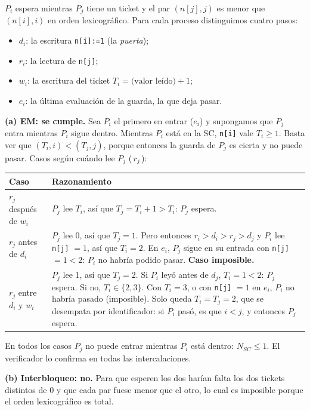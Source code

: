 \begin{solucion}
$P_i$ espera mientras $P_j$ tiene un ticket y el par $(n[j], j)$ es menor que $(n[i], i)$ en orden lexicográfico.
Para cada proceso distinguimos cuatro pasos:
\begin{itemize}[leftmargin=*,noitemsep]
  \item $d_i$: la escritura \texttt{n[i]:=1} (la \emph{puerta});
  \item $r_i$: la lectura de \texttt{n[j]};
  \item $w_i$: la escritura del ticket $T_i = \text{(valor leído)} + 1$;
  \item $e_i$: la última evaluación de la guarda, la que deja pasar.
\end{itemize}

\textbf{(a) EM: se cumple.} Sea $P_i$ el primero en entrar ($e_i$) y supongamos que $P_j$ entra mientras $P_i$
sigue dentro. Mientras $P_i$ está en la SC, \texttt{n[i]} vale $T_i \ge 1$. Basta ver que $(T_i, i) < (T_j, j)$,
porque entonces la guarda de $P_j$ es cierta y no puede pasar. Casos según cuándo lee $P_j$ (\,$r_j$\,):
\begin{center}\small
\begin{tabular}{p{3.6cm}p{10.2cm}}
\toprule
\textbf{Caso} & \textbf{Razonamiento} \\ \midrule
$r_j$ después de $w_i$ & $P_j$ lee $T_i$, así que $T_j = T_i + 1 > T_i$: $P_j$ espera. \\
$r_j$ antes de $d_i$ & $P_j$ lee 0, así que $T_j = 1$. Pero entonces $r_i > d_i > r_j > d_j$ y $P_i$ lee
\texttt{n[j]} $= 1$, así que $T_i = 2$. En $e_i$, $P_j$ sigue en su entrada con \texttt{n[j]} $= 1 < 2$: $P_i$ no
habría podido pasar. \textbf{Caso imposible.} \\
$r_j$ entre $d_i$ y $w_i$ & $P_j$ lee 1, así que $T_j = 2$. Si $P_i$ leyó antes de $d_j$, $T_i = 1 < 2$: $P_j$
espera. Si no, $T_i \in \{2, 3\}$. Con $T_i = 3$, o con \texttt{n[j]} $= 1$ en $e_i$, $P_i$ no habría pasado
(imposible). Solo queda $T_i = T_j = 2$, que se desempata por identificador: si $P_i$ pasó, es que $i < j$, y
entonces $P_j$ espera. \\
\bottomrule
\end{tabular}
\end{center}
En todos los casos $P_j$ no puede entrar mientras $P_i$ está dentro: $N_{SC} \le 1$. El verificador lo confirma en
todas las intercalaciones.

\textbf{(b) Interbloqueo: no.} Para que esperen los dos harían falta los dos tickets distintos de 0 y que cada par
fuese menor que el otro, lo cual es imposible porque el orden lexicográfico es total.


\end{solucion}

